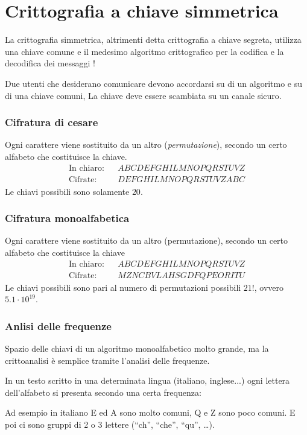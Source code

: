 \documentclass[oneside,a4paper,11pt]{book}
\theoremstyle{italicstyle}
\theoremstyle{normStyle}
\begin{document}
\section{Crittografia a chiave simmetrica}
La crittografia simmetrica, altrimenti detta crittografia a chiave segreta,
utilizza una chiave comune e il medesimo algoritmo crittografico per
la codifica e la decodifica dei messaggi !

Due utenti che desiderano comunicare devono accordarsi su di un algoritmo e su di una chiave comuni,
La chiave deve essere scambiata su un canale sicuro.
\subsubsection{Cifratura di cesare}
Ogni carattere viene sostituito da un altro (\textit{permutazione}), secondo un certo alfabeto
che costituisce la chiave.
\[
\begin{matrix}
  \text{In chiaro}: && A B C D E F G H I L M N O P Q R S T U V Z \\
  \text{Cifrate}: &&  D E F G H I L M N O P Q R S T U V Z A B C  
\end{matrix}
\]
Le chiavi possibili sono solamente $20$.
\subsubsection{Cifratura monoalfabetica}
Ogni carattere viene sostituito da un altro (permutazione), secondo un certo alfabeto che costituisce la chiave 
\[
\begin{matrix}
  \text{In chiaro}: && A B C D E F G H I L M N O P Q R S T U V Z \\
  \text{Cifrate}: &&  M Z N C B V L A H S G D F Q P E O R I T U
\end{matrix}
\]
Le chiavi possibili sono pari al numero di permutazioni possibili $21!$,
ovvero $5.1 \cdot 10^{19}$.

\subsubsection{Anlisi delle frequenze}
Spazio delle chiavi di un algoritmo monoalfabetico molto grande, ma 
la crittoanalisi è semplice tramite l'analisi delle frequenze.

In un testo scritto in una determinata lingua (italiano, inglese...)
ogni lettera dell’alfabeto si presenta secondo una certa frequenza:

Ad esempio in italiano E ed A sono molto comuni, Q e Z sono poco comuni.
E poi ci sono gruppi di 2 o 3 lettere (“ch”, “che”, “qu”, \dots).
\end{document}
